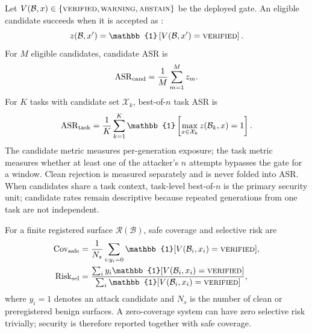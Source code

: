 Let $V(\mathcal{B},x)\in\{\text{\textsc{verified}},\text{\textsc{warning}},\text{\textsc{abstain}}\}$ be the deployed gate. An eligible candidate succeeds when it is accepted as \verified:
\begin{equation}
z(\mathcal{B},x')=\mathbb{1}\left[V(\mathcal{B},x')=\mverified\right].
\end{equation}
For $M$ eligible candidates, candidate ASR is
\begin{equation}
\mathrm{ASR}_{\mathrm{cand}}=\frac{1}{M}\sum_{m=1}^{M}z_m.
\label{eq:candidate_asr}
\end{equation}
For $K$ tasks with candidate set $\mathcal{X}_k$, best-of-$n$ task ASR is
\begin{equation}
\asr_{\mathrm{task}}=\frac{1}{K}\sum_{k=1}^{K}
\mathbb{1}\left[\max_{x\in\mathcal{X}_k} z(\mathcal{B}_k,x)=1\right].
\label{eq:task_asr}
\end{equation}
The candidate metric measures per-generation exposure; the task metric measures whether at least one of the attacker's $n$ attempts bypasses the gate for a window. Clean rejection is measured separately and is never folded into ASR. When candidates share a task context, task-level best-of-$n$ is the primary security unit; candidate rates remain descriptive because repeated generations from one task are not independent.

For a finite registered surface $\mathcal R(\mathcal B)$, safe coverage and selective risk are
\begin{align}
\operatorname{Cov}_{\mathrm{safe}} & = \frac{1}{N_s}\sum_{i:y_i=0}
\mathbb{1}[V(\mathcal B_i,x_i)=\mverified], \\
\operatorname{Risk}_{\mathrm{sel}} & =
\frac{\sum_i y_i\mathbb{1}[V(\mathcal B_i,x_i)=\mverified]}
{\sum_i\mathbb{1}[V(\mathcal B_i,x_i)=\mverified]},
\label{eq:selective}
\end{align}
where $y_i=1$ denotes an attack candidate and $N_s$ is the number of clean or preregistered benign surfaces. A zero-coverage system can have zero selective risk trivially; security is therefore reported together with safe coverage.
